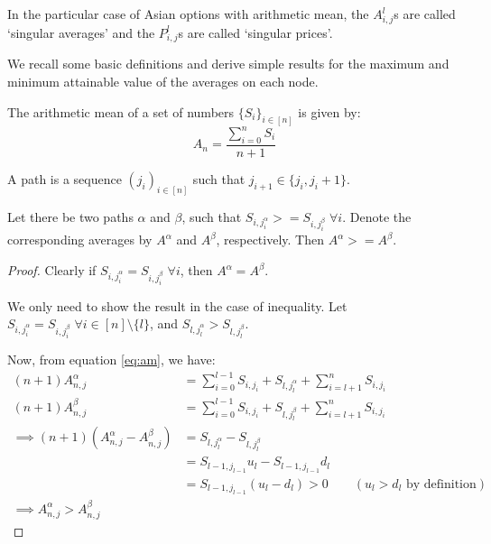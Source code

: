 \begin{dfn}
	In the particular case of Asian options with arithmetic mean, the $ A_{i,j}^l $s are called `singular averages' and the $ P_{i,j}^l $s are called `singular prices'.
\end{dfn}


We recall some basic definitions and derive simple results for the maximum and minimum attainable value of the averages on each node.

\begin{dfn}
	The arithmetic mean of a set of numbers $ \{ S_i \}_{i \in [n]} $ is given by:
	\begin{equation}
	\label{eq:am}
	A_{n} = \frac{\sum_{i=0}^n S_i}{n+1}
	\end{equation}
\end{dfn}


\begin{dfn}[Path]
	A path is a sequence $(j_i)_{i \in [n]}$ such that $j_{i+1} \in \{ j_i,j_i+1 \}$.
\end{dfn}


\begin{thm}
	\label{thm:sp-up-dn-path}
	Let there be two paths $\alpha$ and $\beta$, such that $S_{i,j_i^\alpha} >= S_{i,j_i^\beta} \; \forall i$. Denote the corresponding averages by $A^\alpha$ and $A^\beta$, respectively. Then $ A^\alpha >= A^\beta $.
\end{thm}

\begin{proof}
	Clearly if $S_{i,j_i^\alpha} = S_{i,j_i^\beta} \; \forall i$, then $A^\alpha = A^\beta$.
	
	We only need to show the result in the case of inequality.
	Let $ S_{i,j_i^\alpha} = S_{i,j_i^\beta} \; \forall i \in [n] \setminus \{l\} $, and $ S_{l,j_l^\alpha} > S_{l,j_l^\beta}$.
	
	Now, from equation \ref{eq:am}, we have:
	\begin{align*}
	(n+1) A_{n,j}^\alpha &= \sum_{i=0}^{l-1} S_{i,j_i} + S_{l,j_l^\alpha} + \sum_{i=l+1}^{n} S_{i,j_i} \\
	(n+1) A_{n,j}^\beta &= \sum_{i=0}^{l-1} S_{i,j_i} + S_{l,j_l^\beta} + \sum_{i=l+1}^{n} S_{i,j_i} \\
	\implies (n+1) \left(A_{n,j}^\alpha - A_{n,j}^\beta\right) &= S_{l,j_l^\alpha} - S_{l,j_l^\beta} \\
	&= S_{l-1,j_{l-1}} u_l - S_{l-1,j_{l-1}} d_l \\
	&= S_{l-1,j_{l-1}} (u_l - d_l) > 0 \qquad (u_l > d_l \text{ by definition}) \\
	\implies A_{n,j}^\alpha > A_{n,j}^\beta
	\end{align*}
\end{proof}


